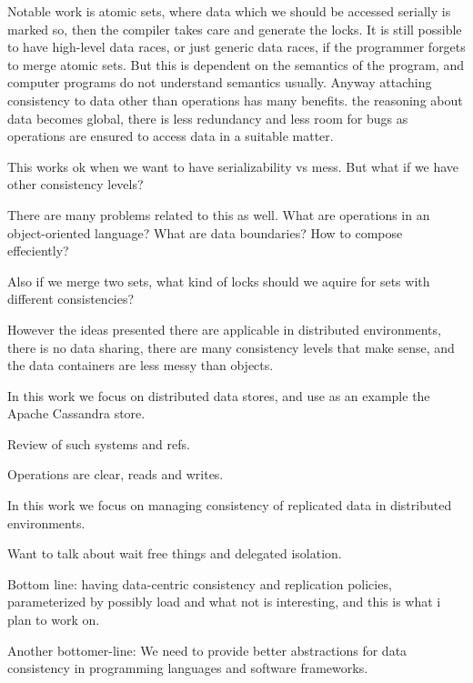 \documentclass[]{usiinfprospectus}
\begin{document}
Notable work is atomic sets, where data which we should be accessed serially is marked so, then the compiler takes care and generate the locks. It is still possible to have high-level data races, or just generic data races, if the programmer forgets to merge atomic sets. But this is dependent on the semantics of the program, and computer programs do not understand semantics usually. Anyway attaching consistency to data other than operations has many benefits. the reasoning about data becomes global, there is less redundancy and less room for bugs as operations are ensured to access data in a suitable matter.

This works ok when we want to have  serializability vs mess. But what if we have
other consistency levels?

There are many problems related to this as well. What are operations in an object-oriented language? What are data boundaries? How to compose effeciently?

Also if we merge two sets, what kind of locks should we aquire for sets with different consistencies?

However the  ideas presented there  are applicable in  distributed environments,
there is  no data sharing,  there are many  consistency levels that  make sense,
and the data containers are less messy than objects.

In this work we focus on distributed data stores, and use as an example the Apache Cassandra store. 

Review of such systems and refs.

Operations are clear, reads and writes. 

In this work we focus on managing consistency of replicated data in distributed environments. 

Want to talk about wait free things and delegated isolation.

Bottom line: having data-centric consistency and replication policies, parameterized by possibly load and what not is interesting, and this is what i plan to work on. 

Another bottomer-line: We need to provide better abstractions for data consistency in programming languages and software frameworks. 
\end{document}
